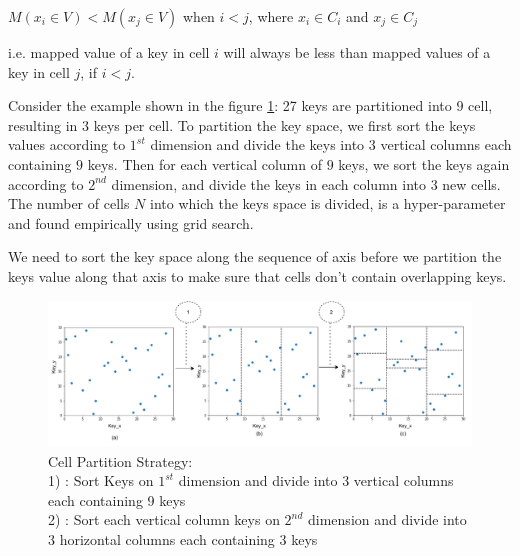 
    $ M(x_{i} \in V) <  M(x_{j} \in V)$ when $i<j$, where $x_{i} \in C_{i}$ and $x_{j} \in C_{j}$ 
    
i.e. mapped value of a key in cell $i$ will always be less than mapped values of a key in cell $j$, if $i <j$.

\begin{mscexample}
	Consider the example shown in the figure \ref{fig:Cell_Parttion}: 27 keys are partitioned into $9$ cell,  resulting in $3$ keys per cell. To partition the key space, we first sort the keys values according to $1^{st}$ dimension and divide the keys into $3$ vertical columns each containing $9$ keys. Then for each vertical column of $9$ keys, we sort the keys again according to $2^{nd}$ dimension, and divide the keys in each column into $3$ new cells. The number of cells $N$ into which the keys space is divided, is a hyper-parameter and found empirically using grid search.

\end{mscexample}

We need to sort the key space along the sequence of axis before we partition the keys value along that axis to make sure that cells don't contain overlapping keys. \\

\begin{figure}[t]
    \centering
    \includegraphics[width=1\textwidth]{graphs/implementation/cell_generation.pdf}
    \caption{Cell Partition Strategy: \\
    1) : Sort Keys on $1^{st}$ dimension and divide into 3 vertical columns each containing 9 keys\\
    2) : Sort each vertical column keys on $2^{nd}$ dimension and divide into 3 horizontal columns each containing 3 keys}
    \label{fig:Cell_Parttion}
\end{figure}

